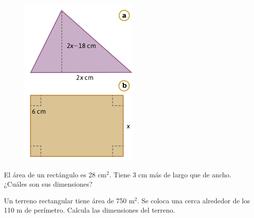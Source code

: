\documentclass[11pt]{book}
\begin{document}
\begin{enumerate}
        \begin{minipage}[t]{0.35\textwidth}
          \begin{figure}[H]
            \centering
            \includegraphics[width=\linewidth]{figuras2.7.png}
            \label{fig:figuras2.7}
          \end{figure}
        \end{minipage}\hfill
        \begin{minipage}[t]{0.5\textwidth}
          \item El área de un rectángulo es 28 cm$^2$. Tiene 3 cm más de largo que de ancho. ¿Cuáles son sus dimensiones?
          \item Un terreno rectangular tiene área de 750 m$^2$. Se coloca una cerca alrededor de los 110 m de perímetro. Calcula las dimensiones del terreno.

\end{minipage}
\end{enumerate}
\end{document}
